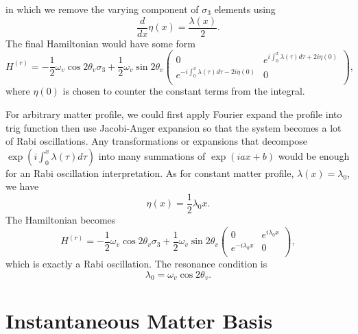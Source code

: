 in which we remove the varying component of $\sigma_3$ elements using
\begin{equation}
    \frac{d}{dx}\eta(x) = \frac{\lambda(x)}{2}.
\end{equation}
The final Hamiltonian would have some form
\begin{equation}
     H^{(r)} = - \frac{1}{2}\omega_v \cos 2\theta_v \sigma_3 + \frac{1}{2} \omega_v \sin 2\theta_v \begin{pmatrix}
   0 & e^{i\int_0^x \lambda(\tau)d\tau + 2i\eta(0)} \\
   e^{-i\int_0^x \lambda(\tau)d\tau - 2i\eta(0)} & 0 \\
   \end{pmatrix},
\end{equation}
where $\eta(0)$ is chosen to counter the constant terms from the integral.

For arbitrary matter profile, we could first apply Fourier expand the profile into trig function then use Jacobi-Anger expansion so that the system becomes a lot of Rabi oscillations.
Any transformations or expansions that decompose $\exp{\left(i\int_0^x \lambda(\tau)d\tau\right)}$ into many summations of $\exp{\left( i a x + b \right)}$ would be enough for an Rabi oscillation interpretation.
As for constant matter profile, $\lambda(x) = \lambda_0$, we have
\begin{equation}
     \eta(x) = \frac{1}{2} \lambda_0 x.
\end{equation}
The Hamiltonian becomes
\begin{equation}
     H^{(r)} = - \frac{1}{2}\omega_v \cos 2\theta_v \sigma_3 + \frac{1}{2} \omega_v \sin 2\theta_v \begin{pmatrix}
   0 & e^{i\lambda_0 x} \\
   e^{-i\lambda_0 x} & 0 \\
   \end{pmatrix},
\end{equation}
which is exactly a Rabi oscillation. The resonance condition is
\begin{equation}
   \lambda_0 = \omega_v \cos 2\theta_v.
\end{equation}





\section{Instantaneous Matter Basis}


